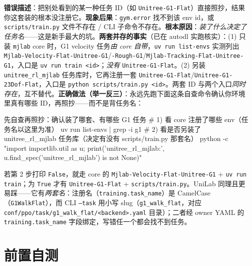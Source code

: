 \begin{pitfall}
\textbf{错误描述}：把别处看到的某一种任务 ID（如 \texttt{Unitree-G1-Flat}）直接照抄，结果你这套装的根本没注册它。\textbf{现象后果}：\verb|gym.error| 找不到该 env id，或 \texttt{scripts/train.py} 文件不存在 / CLI 子命令不存在。\textbf{根本原因}：\emph{装了什么决定了任务名}——这是新手最大的坑。\textbf{两套并存的事实}（已在 autodl 实跑核实）：\;(1) 只装 \texttt{mjlab} core 时，G1 velocity 任务\emph{由 core 自带}，\texttt{uv run list-envs} 实测列出 \texttt{Mjlab-Velocity-Flat-Unitree-G1}/\texttt{-Rough-G1}/\texttt{Mjlab-Tracking-Flat-Unitree-G1}，入口是 \texttt{uv run train <id>}；\emph{没有} \texttt{Unitree-G1-Flat}。\;(2) 另装 \texttt{unitree\_rl\_mjlab} 任务库时，它再注册一套 \texttt{Unitree-G1-Flat}/\texttt{Unitree-G1-23Dof-Flat}，入口是 \texttt{python scripts/train.py <id>}。两套 ID 与两个入口\emph{同时存在}，互不替代。\textbf{正确做法（举一反三）}：永远先跑下面这条自查命令确认你环境里真有哪些 ID，再照抄——而不是背任务名：
\begin{codebox}[bash]{先自查再照抄：确认装了哪套、有哪些 G1 任务}
# 1) 看 core 注册了哪些 env（任务名以这里为准）
uv run list-envs | grep -i g1
# 2) 看是否另装了 unitree_rl_mjlab 任务库（决定有没有 scripts/train.py 那套名）
python -c "import importlib.util as u; print('unitree_rl_mjlab:', u.find_spec('unitree_rl_mjlab') is not None)"
\end{codebox}
若第 2 步打印 \texttt{False}，就走 core 的 \texttt{Mjlab-Velocity-Flat-Unitree-G1} + \texttt{uv run train}；为 \texttt{True} 才有 \texttt{Unitree-G1-Flat} + \texttt{scripts/train.py}。\;UniLab 同理且更易踩——它有\emph{两套名}：注册名（\texttt{training.task\_name}）是 CamelCase（\texttt{G1WalkFlat}），而 CLI \texttt{--task} 用小写 slug（\texttt{g1\_walk\_flat}，对应 \texttt{conf/ppo/task/g1\_walk\_flat/<backend>.yaml} 目录）；二者经 owner YAML 的 \texttt{training.task\_name} 字段绑定，写错任一个都会找不到任务。
\end{pitfall}

\section*{前置自测}

